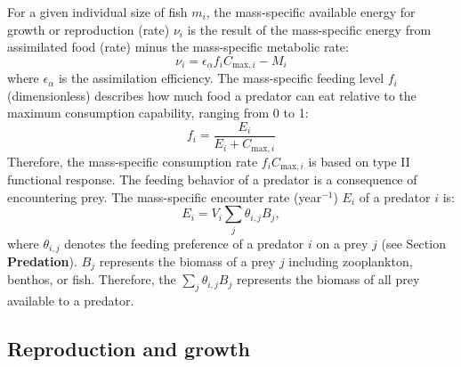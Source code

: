 \documentclass[
]{article}
\begin{document}
For a given individual size of fish \(m_i\), the mass-specific available
energy for growth or reproduction (rate) \(\nu_{i}\) is the result of
the mass-specific energy from assimilated food (rate) minus the
mass-specific metabolic rate: \begin{equation}
\nu_{i} = \epsilon_\alpha f_i C_{\mathrm{max},i} - M_i
\end{equation} where \(\epsilon_\alpha\) is the assimilation efficiency.
The mass-specific feeding level \(f_i\) (dimensionless) describes how
much food a predator can eat relative to the maximum consumption
capability, ranging from 0 to 1: \begin{equation}
f_{i} = \frac{E_{i}}{E_{i}+C_{\mathrm{max},i}}
\end{equation} Therefore, the mass-specific consumption rate
\(f_i C_{\mathrm{max},i}\) is based on type II functional response. The
feeding behavior of a predator is a consequence of encountering prey.
The mass-specific encounter rate (year\(^{-1}\)) \(E_{i}\) of a predator
\(i\) is: \begin{equation}
E_{i} = V_{i}  \sum_{j} \theta_{i,j} B_j,
\end{equation} where \(\theta_{i,j}\) denotes the feeding preference of
a predator \(i\) on a prey \(j\) (see Section \textbf{Predation}).
\(B_j\) represents the biomass of a prey \(j\) including zooplankton,
benthos, or fish. Therefore, the \(\sum_{j} \theta_{i,j} B_j\)
represents the biomass of all prey available to a predator.

\hypertarget{reproduction-and-growth}{%
\subsection{Reproduction and growth}\label{reproduction-and-growth}}
\end{document}
